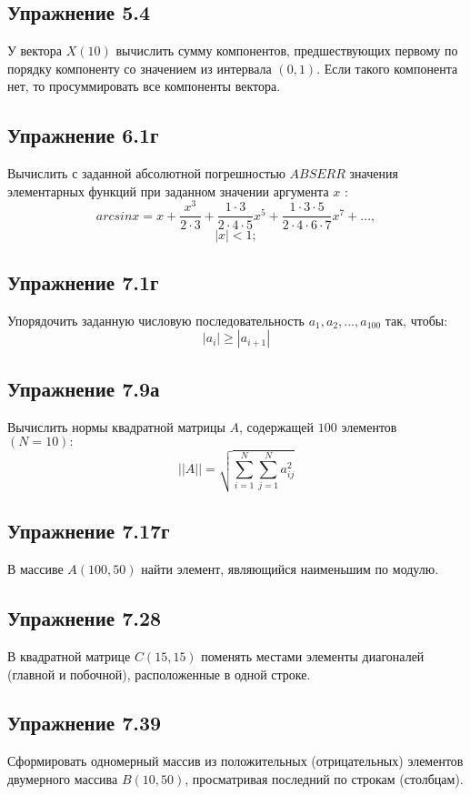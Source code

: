 \subsection{\fontsize{14pt}{16.8pt}Упражнение 5.4}
\noindent
У вектора $ X (10) $ вычислить сумму компонентов, предшествующих первому по порядку компоненту со значением из интервала $ (0, 1) $. Если такого компонента нет, то просуммировать все компоненты вектора.

\subsection{\fontsize{14pt}{16.8pt}Упражнение 6.1г}
\noindent
Вычислить с заданной абсолютной погрешностью $ABSERR$ значения элементарных функций при заданном значении аргумента $x$ :\newline
$$ arcsin x = x + \frac{x^3}{2\cdot3} + \frac{1\cdot3}{2\cdot4\cdot5}x^5 + \frac{1\cdot3\cdot5}{2\cdot4\cdot6\cdot7}x^7 + ...,$$
$$ |x| < 1; $$
    
\subsection{\fontsize{14pt}{16.8pt}Упражнение 7.1г}
\noindent
Упорядочить заданную числовую последовательность $a_1,a_2, ...,a_{100}$ так, чтобы:
$$|a_i| \geq |a_{i+1}|$$
\subsection{\fontsize{14pt}{16.8pt}Упражнение 7.9а}
\noindent
Вычислить нормы квадратной матрицы $A$, содержащей $100$ элементов $( N = 10 ):$
$$ ||A|| = \sqrt{ \sum_{i=1}^{N} \sum_{j=1}^{N} a^2_{ij} } $$
\subsection{\fontsize{14pt}{16.8pt}Упражнение 7.17г}
\noindent
В массиве $A(100,50)$ найти элемент, являющийся наименьшим по модулю.
\subsection{\fontsize{14pt}{16.8pt}Упражнение 7.28}
\noindent
В квадратной матрице $C(15,15)$ поменять местами элементы диагоналей (главной и побочной), расположенные в одной строке.
\subsection{\fontsize{14pt}{16.8pt}Упражнение 7.39}
\noindent
Сформировать одномерный массив из положительных (отрицательных) элементов двумерного массива $B(10,50)$, просматривая последний по строкам (столбцам).

